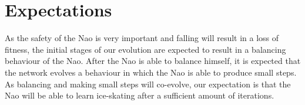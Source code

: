 \documentclass[10pt]{article}
\begin{document}
\section{Expectations}
\label{sec:expectation}

As the safety of the Nao is very important and falling will result in a loss of fitness, the initial stages of our evolution are expected to result in a balancing behaviour of the Nao. After the Nao is able to balance himself, it is expected that the network evolves a behaviour in which the Nao is able to produce small steps. As balancing and making small steps will co-evolve, our expectation is that the Nao will be able to learn ice-skating after a sufficient amount of iterations.  



\end{document}
